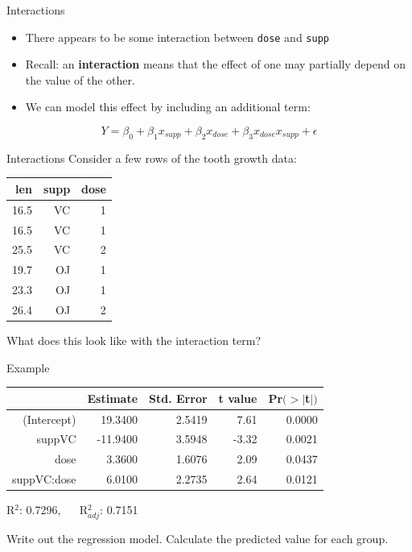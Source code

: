 \begin{frame}{Interactions}
    \begin{itemize}
        \item There appears to be some interaction between \texttt{dose} and \texttt{supp} 
        \item Recall: an \textbf{interaction} means that the effect of one may partially depend on the value of the other.
        \item We can model this effect by including an additional term:
    \end{itemize}
    \[
        Y = \beta_0 + \beta_1 x_{supp} + \beta_2 x_{dose} + \beta_3 x_{dose} x_{supp} + \epsilon
    \]
\end{frame}

\begin{frame}{Interactions}
    Consider a few rows of the tooth growth data:
    \begin{table}[h]
        \centering
        \begin{tabular}{rrr}
            \hline
            len & supp & dose \\ 
            \hline
            16.5 & VC & 1 \\
            16.5 & VC & 1 \\
            25.5 & VC & 2 \\
            19.7 & OJ & 1 \\
            23.3 & OJ & 1 \\
            26.4 & OJ & 2 \\
            \hline
        \end{tabular}
    \end{table}
    What does this look like with the interaction term?
\end{frame}

\begin{frame}{Example}
    \begin{table}[h]
        \centering
        \begin{tabular}{r rrrr}
            \hline
             & Estimate & Std. Error & t value & Pr$(>|$t$|)$ \\
            \hline
            (Intercept) & 19.3400 & 2.5419 & 7.61 & 0.0000 \\
            suppVC & -11.9400 & 3.5948 & -3.32 & 0.0021 \\
            dose & 3.3600 & 1.6076 & 2.09 & 0.0437 \\
            suppVC:dose & 6.0100 & 2.2735 & 2.64 & 0.0121 \\
            \hline
        \end{tabular}
        \label{tab:my_label}
    \end{table}
    R$^2$: 0.7296, $\quad$ R$^2_{adj}$: 0.7151 
    
    \vspace{12pt}Write out the regression model. Calculate the predicted value for each group. 
\end{frame}

